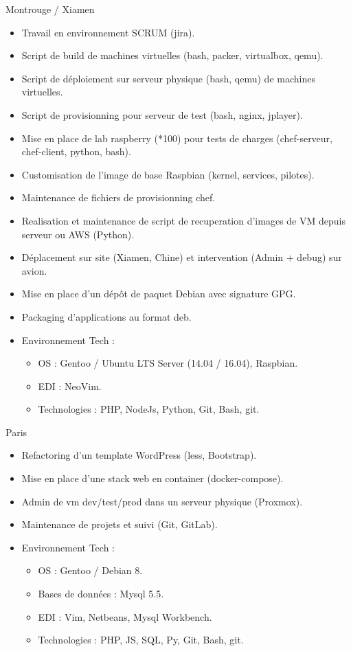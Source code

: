 \documentclass[10pt,a4paper,sans]{moderncv}
\begin{document}
{Montrouge / Xiamen}{
  \begin{itemize}%
    \item Travail en environnement SCRUM (jira).
    \item Script de build de machines virtuelles (bash, packer, virtualbox, qemu).
    \item Script de déploiement sur serveur physique (bash, qemu) de machines virtuelles.
    \item Script de provisionning pour serveur de test (bash, nginx, jplayer).
    \item Mise en place de lab raspberry (*100) pour tests de charges (chef-serveur, chef-client, python, bash).
    \item Customisation de l'image de base Raspbian (kernel, services, pilotes).
    \item Maintenance de fichiers de provisionning chef.
    \item Realisation et maintenance de script de recuperation d'images de VM depuis serveur ou AWS (Python).
    \item Déplacement sur site (Xiamen, Chine) et intervention (Admin + debug) sur avion.
    \item Mise en place d'un dépôt de paquet Debian avec signature GPG.
    \item Packaging d'applications au format deb.
    \item Environnement Tech :
      \begin{itemize}%
        \item OS : Gentoo / Ubuntu LTS Server (14.04 / 16.04), Raspbian.
        \item EDI : NeoVim.
        \item Technologies : PHP, NodeJs, Python, Git, Bash, git.
      \end{itemize}
  \end{itemize}}

{Paris}{
  \begin{itemize}%
    \item Refactoring d'un template WordPress (less, Bootstrap).
    \item Mise en place d'une stack web en container (docker-compose).
    \item Admin de vm dev/test/prod dans un serveur physique (Proxmox).
    \item Maintenance de projets et suivi (Git, GitLab).
    \item Environnement Tech :
      \begin{itemize}%
        \item OS : Gentoo / Debian 8.
        \item Bases de données : Mysql 5.5.
        \item EDI : Vim, Netbeans, Mysql Workbench.
        \item Technologies : PHP, JS, SQL, Py, Git, Bash, git.
      \end{itemize}
  \end{itemize}}
\end{document}

